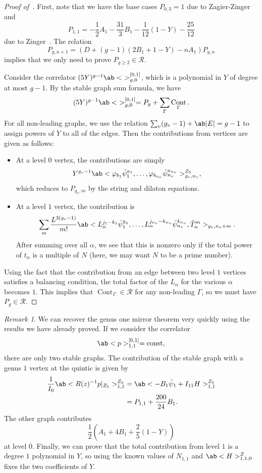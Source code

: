 \documentclass[10pt]{amsart}
\theoremstyle{definition}
\theoremstyle{remark}
\newtheorem{rmk}[thm]{Remark}
\theoremstyle{plain}
\theoremstyle{definition}
\theoremstyle{remark}
\newcommand{\mc}[1]{\mathcal{#1}}
\newcommand{\mr}[1]{\mathrm{#1}}
\newcommand{\1}{\mathbf{1}}
\newcommand{\2}{\mathbf{2}}
\newcommand{\3}{\mathbf{3}}
\DeclareMathOperator{\Cont}{Cont}
\begin{document}
\begin{proof}[Proof of~]
    First, note that we have the base cases $P_{0,3} = 1$ due to Zagier-Zinger~\cite{zagierzinger} and
    \[ P_{1,1} = -\frac{1}{2} A_1 - \frac{31}{3} B_1 - \frac{1}{12} (1-Y) - \frac{25}{12} \]
    due to Zinger~\cite{reducedgenus1}. The relation 
    \[ P_{g,n+1} = (D + (g-1)(2B_1+1-Y) - nA_1) P_{g,n} \]
    implies that we only need to prove $P_{g \geq 2} \in \mc{R}$.

    Consider the correlator $(5Y)^{g-1}\ab<\ >_{g,0}^{[0,1]}$, which is a polynomial in $Y$ of degree at most $g-1$. By the stable graph sum formula, we have
    \[ (5Y)^{g-1}\ab<\ >_{g,0}^{[0,1]} = P_g + \sum_{\Gamma} \Cont_{\Gamma}. \]
    For all non-leading graphs, we use the relation $\sum_v (g_v-1) + \ab|E| = g-1$ to assign powers of $Y$ to all of the edges. Then the contributions from vertices are given as follows:
    \begin{itemize}
        \item At a level $0$ vertex, the contributions are simply
            \[ Y^{g_v-1} \ab<\varphi_{b_1} \bar{\psi}_1^{a_1}, \ldots, \varphi_{b_{n_v}} \bar{\psi}_{n_v}^{a_{n_v}}>^{Z_5}_{g_v, n_v}, \]
            which reduces to $P_{g_v, m}$ by the string and dilaton equations. 
        \item At a level $1$ vertex, the contribution is
            \[ \sum_m \frac{L^{3(g_v-1)}}{m!}\ab<L_{\alpha}^{j_1-k_1}\bar{\psi}_1^{k_1}, \ldots, L_{\alpha}^{j_{n_v} - k_{n_v}} \bar{\psi}_{n_v}^{k_{n_v}}, \tilde{T}_{\alpha}^m>_{g_v, n_v+m}. \]
            After summing over all $\alpha$, we see that this is nonzero only if the total power of $t_{\alpha}$ is a multiple of $N$ (here, we may want $N$ to be a prime number).
    \end{itemize}
    Using the fact that the contribution from an edge between two level $1$ vertices satisfies a balancing condition, the total factor of the $L_{\alpha}$ for the various $\alpha$ becomes $1$. This implies that $\Cont_{\Gamma} \in \mc{R}$ for any non-leading $\Gamma$, so we must have $P_g \in \mc{R}$.
\end{proof}

\begin{rmk}
    We can recover the genus one mirror theorem very quickly using the results we have already proved. If we consider the correlator
    \[ \ab<p>_{1,1}^{[0,1]} = \mr{const}, \]
    there are only two stable graphs. The contribution of the stable graph with a genus $1$ vertex at the quintic is given by
    \begin{align*}
        \frac{1}{I_0}\ab<R(z)^{-1}p|_{Z_5}>^{Z_5}_{1,1} &= \ab<-B_1\bar{\psi}_1 + I_{11}H>^{Z_5}_{1,1} \\
        &= P_{1,1} + \frac{200}{24} B_1.
    \end{align*}
    The other graph contributes
    \[ \frac{1}{2}(A_1+4B_1 + \frac{2}{5}(1-Y)) \]
    at level $0$. Finally, we can prove that the total contribution from level $1$ is a degree $1$ polynomial in $Y$, so using the known values of $N_{1,1}$ and $\ab<H>^Z_{1,1,0}$ fixes the two coefficients of $Y$.
\end{rmk}
\end{document}
